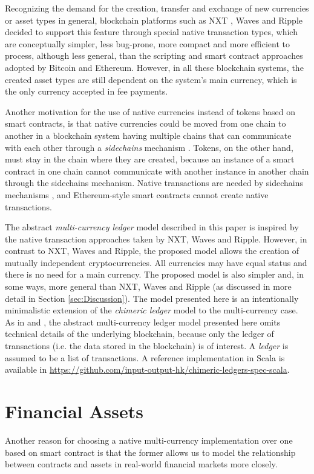 \documentclass{llncs}
\begin{document}
Recognizing the demand for the creation, transfer and exchange of new currencies or asset types in general, blockchain platforms such as NXT \cite{NXT}, Waves \cite{Waves} and Ripple \cite{Ripple} decided to support this feature through special native transaction types, which are conceptually simpler, less bug-prone, more compact and more efficient to process, although less general, than the scripting and smart contract approaches adopted by Bitcoin and Ethereum. However, in all these blockchain systems, the created asset types are still dependent on the system's main currency, which is the only currency accepted in fee payments.

Another motivation for the use of native currencies instead of tokens based on smart contracts, is that native currencies could be moved from one chain to another in a blockchain system having multiple chains that can communicate with each other through a \emph{sidechains} mechanism \cite{Sidechains,SidechainsOuroboros}. Tokens, on the other hand, must stay in the chain where they are created, because an instance of a smart contract in one chain cannot communicate with another instance in another chain through the sidechains mechanism. Native transactions are needed by sidechains mechanisms \cite{SidechainsOuroboros}, and Ethereum-style smart contracts cannot create native transactions.

The abstract \emph{multi-currency ledger} model described in this paper is inspired by the native transaction approaches taken by NXT, Waves and Ripple. However, in contrast to NXT, Waves and Ripple, the proposed model allows the creation of mutually independent cryptocurrencies. All currencies may have equal status and there is no need for a main currency. The proposed model is also simpler and, in some ways, more general than NXT, Waves and Ripple (as discussed in more detail in Section \ref{sec:Discussion}). The model presented here is an intentionally minimalistic extension of the \emph{chimeric ledger} model \cite{ChimericLedgers} to the multi-currency case. As in \cite{ChimericLedgers} and \cite{UTxOScripts}, the abstract multi-currency ledger model presented here omits technical details of the underlying blockchain, because only the ledger of transactions (i.e. the data stored in the blockchain) is of interest. A \emph{ledger} is assumed to be a list of transactions.
%
A reference implementation in Scala is available in \url{https://github.com/input-output-hk/chimeric-ledgers-spec-scala}.

\section{Financial Assets}
Another reason for choosing a native multi-currency implementation over one  based on smart contract is that the former allows us to model the relationship between contracts and assets in real-world financial markets more closely. 
\end{document}
